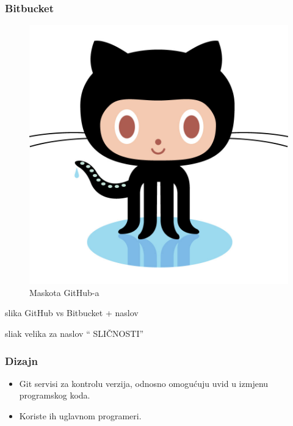 \documentclass{beamer}
\begin{document}
	\begin{frame}              
		\frametitle{Bitbucket}



		\begin{figure}[h!]
			\begin{center}
				\includegraphics[scale=0.10]{macka.png}
				\caption{Maskota GitHub-a}
			\end{center}
	\end{figure}

	\end{frame}                %








	\begin{frame}        

	slika GitHub vs Bitbucket + naslov     


	\end{frame}                             %


	\begin{frame}
		sliak velika za naslov `` SLIČNOSTI''

	\end{frame}


	\begin{frame}
		\frametitle{Dizajn}
		
		\begin{itemize}
			\item Git servisi za kontrolu verzija, odnosno omogućuju uvid u izmjenu programskog koda.
			\item Koriste ih uglavnom programeri.


		\end{itemize}

	\end{frame}                              %
\end{document}
